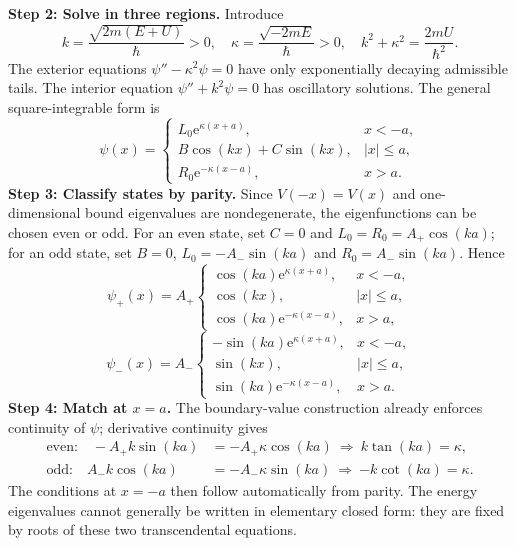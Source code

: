 \documentclass[11pt,a4paper]{article}
\newcommand{\ee}{\mathrm{e}}
\newcommand{\R}{\mathbb R}
\newcommand{\abs}[1]{\left|#1\right|}
\begin{document}
\textbf{Step 2: Solve in three regions.} Introduce
\begin{equation}
k=\frac{\sqrt{2m(E+U)}}\hbar>0,\quad \kappa=\frac{\sqrt{-2mE}}\hbar>0,\quad k^2+\kappa^2=\frac{2mU}{\hbar^2}.
\end{equation}
The exterior equations $\psi''-\kappa^2\psi=0$ have only exponentially decaying admissible tails. The interior equation $\psi''+k^2\psi=0$ has oscillatory solutions. The general square-integrable form is
\begin{equation}
\psi(x)=\begin{cases}L_0\ee^{\kappa(x+a)},&x<-a,\\B\cos(kx)+C\sin(kx),&\abs x\leq a,\\R_0\ee^{-\kappa(x-a)},&x>a.\end{cases}
\end{equation}
\textbf{Step 3: Classify states by parity.} Since $V(-x)=V(x)$ and one-dimensional bound eigenvalues are nondegenerate, the eigenfunctions can be chosen even or odd. For an even state, set $C=0$ and $L_0=R_0=A_+\cos(ka)$; for an odd state, set $B=0$, $L_0=-A_-\sin(ka)$ and $R_0=A_-\sin(ka)$. Hence
\begin{equation}\label{eq:finite_even}
\boxed{\psi_+(x)=A_+\begin{cases}\cos(ka)\ee^{\kappa(x+a)},&x<-a,\\\cos(kx),&\abs x\leq a,\\\cos(ka)\ee^{-\kappa(x-a)},&x>a,\end{cases}}
\end{equation}
\begin{equation}\label{eq:finite_odd}
\boxed{\psi_-(x)=A_-\begin{cases}-\sin(ka)\ee^{\kappa(x+a)},&x<-a,\\\sin(kx),&\abs x\leq a,\\\sin(ka)\ee^{-\kappa(x-a)},&x>a.\end{cases}}
\end{equation}
\textbf{Step 4: Match at $x=a$.} The boundary-value construction already enforces continuity of $\psi$; derivative continuity gives
\begin{align}
\text{even:}\quad -A_+k\sin(ka)&=-A_+\kappa\cos(ka)\ \Longrightarrow\ \boxed{k\tan(ka)=\kappa},\\
\text{odd:}\quad A_-k\cos(ka)&=-A_-\kappa\sin(ka)\ \Longrightarrow\ \boxed{-k\cot(ka)=\kappa}.
\end{align}
The conditions at $x=-a$ then follow automatically from parity. The energy eigenvalues cannot generally be written in elementary closed form: they are fixed by roots of these two transcendental equations.
\end{document}
